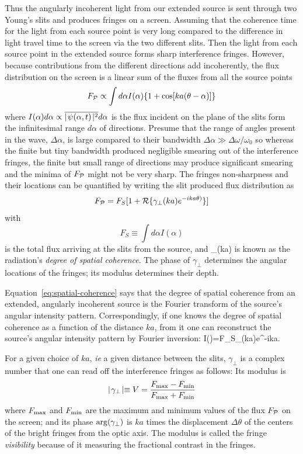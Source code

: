 Thus the angularly incoherent light from our extended source is sent through two Young's slits and produces fringes on a screen. Assuming that the coherence time for the
light from each source point is very long compared to the difference in light travel time
 to the screen via the two different slits. Then the light from each source point in the 
extended source forms sharp interference fringes. However, because contributions from the different directions add incoherently, the flux distribution on the screen is a linear sum of the fluxes from all the source points
\[
F_{{\cal P}}\propto\int d\alpha I(\alpha)\{1+\cos[ka(\theta-\alpha)]\}
\]
where $I(\alpha)d\alpha\propto\overline{\mid\!\psi(\alpha,t)\!\mid^2}d\alpha$ is the flux incident on the plane of the slits form the infinitesimal range $d\alpha$ of directions. Presume that the range of angles present in the wave, $\Delta\alpha$, is large compared to their bandwidth $\Delta\alpha\gg{\Delta\omega/\omega_0}$ so whereas the finite but tiny bandwidth produced negligible smearing out of the interference fringes, the finite but small range of directions may produce significant smearing and the minima of $F_{{\cal P}}$ might not be very sharp. The fringes non-sharpness and their locations can be quantified by writing the slit produced flux distribution as
\[
F_{{\cal P}}=F_S[1+{\cal R}\{\gamma_\perp(ka)e^{-ika\theta)}\}]
\]
with
\[
F_S\equiv\int d\alpha I(\alpha)
\]
is the total flux arriving at the slits from the source, and 
\be
\gamma_\perp(ka)
\label{eq:spatial-coherence}
\ee
is known as the radiation's {\it degree of spatial coherence}. The phase of $\gamma_\perp$ determines the angular locations of the fringes; its modulus determines their depth. 

Equation~\ref{eq:spatial-coherence} says that the degree of spatial coherence from an extended, angularly incoherent source is the Fourier transform of the source's angular intensity pattern. Correspondingly, if one knows the degree of spatial coherence as a function of the distance $ka$, from it one can reconstruct the source's angular intensity pattern by Fourier inversion:
\be
I(\alpha)=F_S\gamma_\perp(ka)e^{-ika\alpha}.
\label{eq:fourier-coherence}
\ee

For a given choice of $ka$, {\it ie} a given distance between the slits, $\gamma_\perp$ is a complex number that one can read off the interference fringes as follows: Its modulus is 
\[
\mid\!\gamma_\perp\!\mid\equiv V={F_{\rm max}-F_{\rm min}\over F_{\rm max}+F_{\rm min}}
\]
where $F_{\rm max}$ and $F_{\rm min}$ are the maximum and minimum values of the flux $F_{{\cal P}}$ on the screen; and its phase ${\rm arg}(\gamma_\perp)$ is $ka$ times the displacement $\Delta\theta$ of the centers of the bright fringes from the optic axis. The modulus is called the fringe {\it visibility} because of it measuring the fractional contrast in the fringes. 

